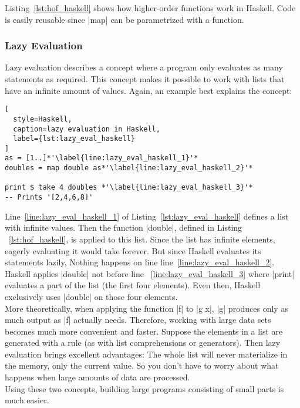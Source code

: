 Listing~\ref{lst:hof_haskell} shows how higher-order functions work in Haskell.
Code is easily reusable since |map| can be parametrized with a function.

\subsubsection{Lazy Evaluation} %
\label{subsub:Evaluation}
Lazy evaluation describes a concept where a program only evaluates as many
statements as required. This concept makes it possible to work with lists that
have an infinite amount of values. Again, an example best explains the concept:

\begin{lstlisting}[
  style=Haskell,
  caption=lazy evaluation in Haskell,
  label={lst:lazy_eval_haskell}
]
as = [1..]*'\label{line:lazy_eval_haskell_1}'*
doubles = map double as*'\label{line:lazy_eval_haskell_2}'*

print $ take 4 doubles *'\label{line:lazy_eval_haskell_3}'*
-- Prints '[2,4,6,8]'
\end{lstlisting}
Line~\ref{line:lazy_eval_haskell_1} of Listing~\ref{lst:lazy_eval_haskell}
defines a list with infinite values. Then the function |double|, defined in
Listing ~\ref{lst:hof_haskell}, is applied to this list. Since the list has
infinite elements, eagerly evaluating it would take forever. But since Haskell
evaluates its statements lazily, Nothing happens on line
line~\ref{line:lazy_eval_haskell_2}. Haskell applies |double| not before line
~\ref{line:lazy_eval_haskell_3} where |print| evaluates a part of the list (the
first four elements). Even then, Haskell exclusively uses |double| on those
four elements.\\
More theoretically, when applying the function |f| to |g x|, |g| produces only
as much output as |f| actually needs. Therefore, working with large data sets
becomes much more convenient and faster. Suppose the elements in a list are
generated with a rule (as with list comprehensions or generators). Then lazy
evaluation brings excellent advantages: The whole list will never materialize
in the memory, only the current value. So you don't have to worry about what
happens when large amounts of data are processed. \\ Using these two concepts,
building large programs consisting of small parts is much easier.


